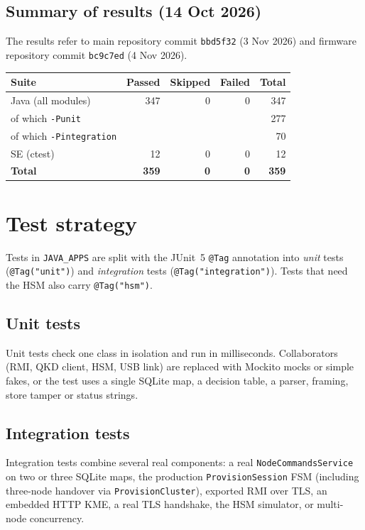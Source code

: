 \documentclass[11pt,a4paper]{report}
\begin{document}
\section*{Summary of results (14 Oct 2026)}
The results refer to main repository commit \texttt{bbd5f32} (3 Nov 2026) and firmware repository commit \texttt{bc9c7ed} (4 Nov 2026).

\begin{tcolorbox}[colback=cardbg,colframe=cardborder,boxrule=0.5pt,arc=2.5pt]
\centering
\begin{tabular}{@{}lrrrr@{}}
\toprule
Suite & Passed & Skipped & Failed & Total \\
\midrule
Java (all modules) & 347 & 0 & 0 & 347 \\
\quad of which \texttt{-Punit} & & & & 277 \\
\quad of which \texttt{-Pintegration} & & & & 70 \\
SE (ctest) & 12 & 0 & 0 & 12 \\
\midrule
\textbf{Total} & \textbf{359} & \textbf{0} & \textbf{0} & \textbf{359} \\
\bottomrule
\end{tabular}
\end{tcolorbox}

\chapter{Test strategy}

Tests in \texttt{JAVA\_APPS} are split with the JUnit~5 \texttt{@Tag} annotation into \emph{unit} tests (\texttt{@Tag("unit")}) and \emph{integration} tests (\texttt{@Tag("integration")}). Tests that need the HSM also carry \texttt{@Tag("hsm")}.

\section{Unit tests}
Unit tests check one class in isolation and run in milliseconds. Collaborators (RMI, QKD client, HSM, USB link) are replaced with Mockito mocks or simple fakes, or the test uses a single SQLite map, a decision table, a parser, framing, store tamper or status strings.

\section{Integration tests}
Integration tests combine several real components: a real \texttt{NodeCommandsService} on two or three SQLite maps, the production \texttt{ProvisionSession} FSM (including three-node handover via \texttt{ProvisionCluster}), exported RMI over TLS, an embedded HTTP KME, a real TLS handshake, the HSM simulator, or multi-node concurrency.
\end{document}

